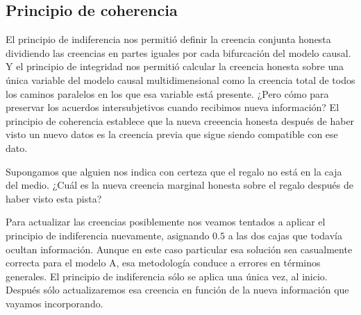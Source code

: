\documentclass[a4paper,10pt]{book}
\theoremstyle{definition}
\begin{document}
\subsection{Principio de coherencia} \label{sec:principio_choerencia} %

El principio de indiferencia nos permiti\'o definir la creencia conjunta honesta dividiendo las creencias en partes iguales por cada bifurcaci\'on del modelo causal.
%
Y el principio de integridad nos permiti\'o calcular la creencia honesta sobre una única variable del modelo causal multidimensional como la creencia total de todos los caminos paralelos en los que esa variable est\'a presente.
%
¿Pero c\'omo para preservar los acuerdos intersubjetivos cuando recibimos nueva informaci\'on?
%
El principio de coherencia establece que la nueva creeencia honesta despu\'es de haber visto un nuevo datos es la creencia previa que sigue siendo compatible con ese dato.


Supongamos que alguien nos indica con certeza que el regalo no est\'a en la caja del medio.
%
¿Cu\'al es la nueva creencia marginal honesta sobre el regalo despu\'es de haber visto esta pista?


\begin{figure}[ht!]
\centering
{} 
\end{figure}


Para actualizar las creencias posiblemente nos veamos tentados a aplicar el principio de indiferencia nuevamente, asignando $0.5$ a las dos cajas que todav\'ia ocultan informaci\'on.
%
Aunque en este caso particular esa soluci\'on sea casualmente correcta para el modelo A, esa metodolog\'ia conduce a errores en t\'erminos generales.
%
El principio de indiferencia s\'olo se aplica una única vez, al inicio.
%
Despu\'es s\'olo actualizaremos esa creencia en funci\'on de la nueva informaci\'on que vayamos incorporando.
\end{document}
